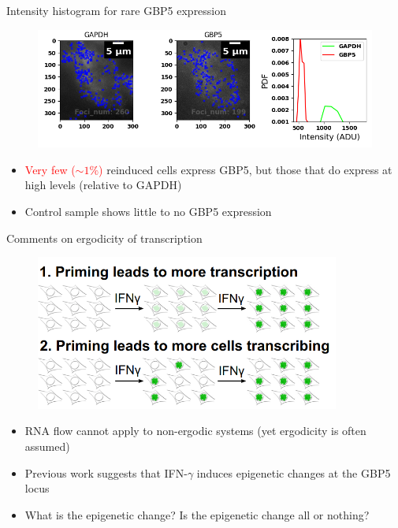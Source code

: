 \documentclass[aspectratio=1610]{beamer}					%
\begin{document}
\begin{frame}{Intensity histogram for rare GBP5 expression}
\begin{figure}
\includegraphics[width=14cm]{Detection.png}
\end{figure}
\begin{itemize}
\item \textcolor{red}{Very few ($\sim 1\%$)} reinduced cells express GBP5, but those that do express at high levels (relative to GAPDH)
\item Control sample shows little to no GBP5 expression
\end{itemize}
\end{frame}

\begin{frame}{Comments on ergodicity of transcription}
\begin{figure}
\includegraphics[width=10cm]{Ergodic.png}
\end{figure}
\begin{itemize}
\item RNA flow cannot apply to non-ergodic systems (yet ergodicity is often assumed)
\item Previous work suggests that IFN-$\gamma$ induces epigenetic changes at the GBP5 locus
\item What is the epigenetic change? Is the epigenetic change all or nothing?
\end{itemize}
\vspace{0.1in}


\end{frame}
\end{document}

